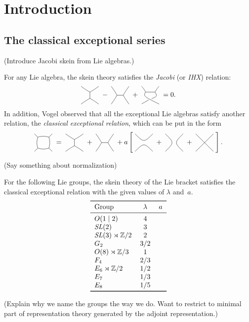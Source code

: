 \documentclass[12pt]{amsart}
\begin{document}
\section{Introduction}
\label{sec:introduction}

\subsection{The classical exceptional series}
\label{sec:classical-except}

(Introduce Jacobi skein from Lie algebras.)

For any Lie algebra, the skein theory satisfies the \emph{Jacobi} (or \emph{IHX})
relation:
\begin{equation}
\drawI\; - \;\drawH\; + \;\drawcrossX\; = 0.
\label{eq:IHX}
\end{equation}
In addition, Vogel observed that all the exceptional Lie algebras
satisfy another relation, the \emph{classical exceptional relation},
which can be put in the form
\begin{equation}
\ngon[45]{4}\; = \;\drawI\; + \;\drawH\;
 + a\left[ \;\twostrandid\; + \;\cupcap\; + \;\symcross\; \right].
\label{eq:classical-except}
\end{equation}

(Say something about normalization)

\begin{theorem}[Vogel]
  For the following Lie groups, the skein theory of the Lie bracket
  satisfies the classical exceptional relation with the given values
  of $\lambda$ and~$a$.
  \[
  \begin{tabular}{lcc}
    \toprule
    Group         & $\lambda$ & $a$\\
    \midrule
    $O(1 \mid 2)$       & $4$ \\
    $\SL(2)$            & $3$ \\
    $\SL(3)\rtimes\ZZ/2$& $2$ \\
    $G_2$              & $3/2$ \\
    $O(8)\rtimes\ZZ/3$  & $1$ \\
    $F_4$               & $2/3$ \\
    $E_6\rtimes\ZZ/2$   & $1/2$ \\
    $E_7$               & $1/3$ \\
    $E_8$               & $1/5$ \\
    \bottomrule
  \end{tabular}
  \]
\end{theorem}
(Explain why we name the groups the way we do. Want to restrict to
minimal part of representation theory generated by the adjoint
representation.)
\end{document}
